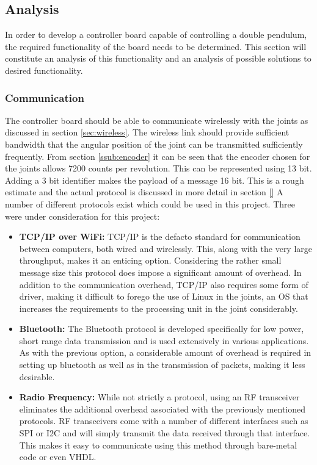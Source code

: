\subsection{Analysis}
\label{sub:controller_board_analysis}

In order to develop a controller board capable of controlling a double pendulum, the required functionality of the board needs to be determined. 
This section will constitute an analysis of this functionality and an analysis of possible solutions to desired functionality.

\subsubsection{Communication} %
\label{ssub:communication}
The controller board should be able to communicate wirelessly with the joints as discussed in section \ref{sec:wireless}.
The wireless link should provide sufficient bandwidth that the angular position of the joint can be transmitted sufficiently frequently.
From section \ref{ssub:encoder} it can be seen that the encoder chosen for the joints allows 7200 counts per revolution.
This can be represented using 13 bit. 
Adding a 3 bit identifier makes the payload of a message 16 bit.
This is a rough estimate and the actual protocol is discussed in more detail in section \ref{} 
A number of different protocols exist which could be used in this project.
Three were under consideration for this project:
\begin{itemize}
	\item \textbf{TCP/IP over WiFi:} TCP/IP is the defacto standard for communication between computers, both wired and wirelessly.
	This, along with the very large throughput, makes it an enticing option.
	Considering the rather small message size this protocol does impose a significant amount of overhead.
	In addition to the communication overhead, TCP/IP also requires some form of driver, making it difficult to forego the use of Linux in the joints, an OS that increases the requirements to the processing unit in the joint considerably.
	\item \textbf{Bluetooth:} The Bluetooth protocol is developed specifically for low power, short range data transmission and is used extensively in various applications.
	As with the previous option, a considerable amount of overhead is required in setting up bluetooth as well as in the transmission of packets, making it less desirable.
	\item \textbf{Radio Frequency:} While not strictly a protocol, using an RF transceiver eliminates the additional overhead associated with the previously mentioned protocols.
	RF transceivers come with a number of different interfaces such as SPI or I2C and will simply transmit the data received through that interface.
	This makes it easy to communicate using this method through bare-metal code or even VHDL.
\end{itemize}
